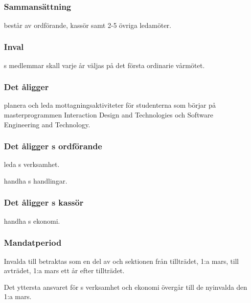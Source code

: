 \subsection{\MRCITFULL}
\subsubsection{Sammansättning}
\MRCIT{} består av ordförande, kassör samt 2-5 övriga ledamöter.

\subsubsection{Inval}
\MRCIT{}s medlemmar skall varje år väljas på det första ordinarie vårmötet.

\subsubsection{Det åligger \MRCIT}
\begin{att}
  \item planera och leda mottagningsaktiviteter för studenterna som börjar på masterprogrammen Interaction Design and Technologies och Software Engineering and Technology.
\end{att}

\subsubsection{Det åligger \MRCIT{}s ordförande}
\begin{att}
  \item leda \MRCIT{}s verksamhet.
  \item handha \MRCIT{}s handlingar.
\end{att}

\subsubsection{Det åligger \MRCIT{}s kassör}
\begin{att}
  \item handha \MRCIT{}s ekonomi.
\end{att}

\subsubsection{Mandatperiod}
Invalda till \MRCIT{} betraktas som en del av \MRCIT{} och sektionen från tillträdet, 1:a mars, till avträdet, 1:a mars ett år efter tillträdet.

Det yttersta ansvaret för \MRCIT{}s verksamhet och ekonomi övergår till de nyinvalda den 1:a mars.